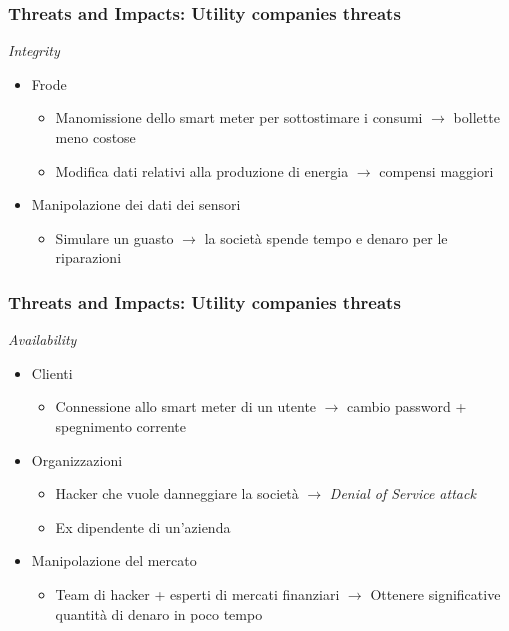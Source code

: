\begin{frame}
  \frametitle{Threats and Impacts: Utility companies threats}
  \textit{Integrity}
  \begin{itemize}[<+- | alert@+>]
	  \item Frode
	  \begin{itemize}
	  \item Manomissione dello smart meter per sottostimare i consumi $\rightarrow$ bollette meno costose 
	  \item Modifica dati relativi alla produzione di energia $\rightarrow$ compensi maggiori
	  \end{itemize}
	\item Manipolazione dei dati dei sensori
		\begin{itemize}
		\item Simulare un guasto $\rightarrow$ la società spende tempo e denaro per le riparazioni
		\end{itemize}
 	\end{itemize}
\end{frame}

\begin{frame}
  \frametitle{Threats and Impacts: Utility companies threats}
  \textit{Availability}
  \begin{itemize}[<+- | alert@+>]
	\item Clienti
	  	\begin{itemize}
	  	\item Connessione allo smart meter di un utente $\rightarrow$ cambio password + spegnimento corrente
	  	\end{itemize}
	\item Organizzazioni
			\begin{itemize}
			\item Hacker che vuole danneggiare la società $\rightarrow$ \textit{Denial of Service attack}
			\item Ex dipendente di un'azienda
			\end{itemize}
	\item Manipolazione del mercato
		\begin{itemize}
		\item Team di hacker + esperti di mercati finanziari $\rightarrow$ Ottenere significative quantità di denaro in poco tempo
		\end{itemize}
 	\end{itemize}
\end{frame}
